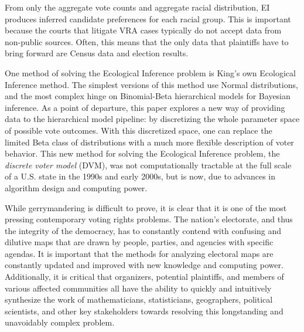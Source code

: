 From only the aggregate vote counts and aggregate racial distribution, EI produces inferred candidate preferences for each racial group. This is important because the courts that litigate VRA cases typically do not accept data from non-public sources. Often, this means that the only data that plaintiffs have to bring forward are Census data and election results.

One method of solving the Ecological Inference problem is King's own Ecological Inference method. The simplest versions of this method use Normal distributions, and the most complex hinge on Binomial-Beta hierarchical models for Bayesian inference. As a point of departure, this paper explores a new way of providing data to the hierarchical model pipeline: by discretizing the whole parameter space of possible vote outcomes. With this discretized space, one can replace the limited Beta class of distributions with a much more flexible description of voter behavior. This new method for solving the Ecological Inference problem, the \textit{discrete voter model} (DVM), was not computationally tractable at the full scale of a U.S. state in the 1990s and early 2000s, but is now, due to advances in algorithm design and computing power.

While gerrymandering is difficult to prove, it is clear that it is one of the most pressing contemporary voting rights problems. The nation’s electorate, and thus the integrity of the democracy, has to constantly contend with confusing and dilutive maps that are drawn by people, parties, and agencies with specific agendas. It is important that the methods for analyzing electoral maps are constantly updated and improved with new knowledge and computing power. Additionally, it is critical that organizers, potential plaintiffs, and members of various affected communities all have the ability to quickly and intuitively synthesize the work of mathematicians, statisticians, geographers, political scientists, and other key stakeholders towards resolving this longstanding and unavoidably complex problem.
